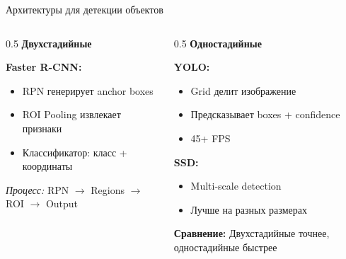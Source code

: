 \documentclass[aspectratio=169, 9pt]{beamer}
\begin{document}
\begin{frame}{Архитектуры для детекции объектов}
\begin{columns}[T]
\begin{column}{0.5\textwidth}
{\bfseries\textcolor{blue!70}{Двухстадийные}}

{\small\textbf{Faster R-CNN:}}
{\small
\begin{itemize}
    \item RPN генерирует anchor boxes
    \item ROI Pooling извлекает признаки
    \item Классификатор: класс + координаты
\end{itemize}
}

\vspace{0.3em}
{\small\textit{Процесс:} RPN $\to$ Regions $\to$ ROI $\to$ Output}
\end{column}

\begin{column}{0.5\textwidth}
{\bfseries\textcolor{green!50!black}{Одностадийные}}

{\small\textbf{YOLO:}}
{\small
\begin{itemize}
    \item Grid делит изображение
    \item Предсказывает boxes + confidence
    \item 45+ FPS
\end{itemize}
}

{\small\textbf{SSD:}}
{\small
\begin{itemize}
    \item Multi-scale detection
    \item Лучше на разных размерах
\end{itemize}
}

\vspace{0.3em}
{\small\textbf{Сравнение:} Двухстадийные точнее, одностадийные быстрее}
\end{column}
\end{columns}
\end{frame}
\end{document}

